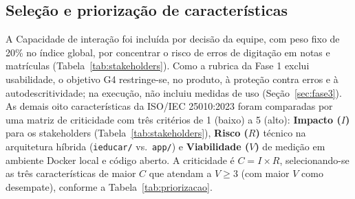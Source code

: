 \documentclass[conference]{model/IEEEtran}%
\begin{document}
\subsection{Seleção e priorização de características}
A Capacidade de interação foi incluída por decisão da equipe, com peso fixo de 20\% no índice global, por concentrar o risco de erros de digitação em notas e matrículas (Tabela~\ref{tab:stakeholders}). Como a rubrica da Fase 1 exclui usabilidade, o objetivo G4 restringe-se, no produto, à proteção contra erros e à autodescritividade; na execução, não incluiu medidas de uso (Seção~\ref{sec:fase3}). As demais oito características da ISO/IEC 25010:2023 foram comparadas por uma matriz de criticidade com três critérios de 1 (baixo) a 5 (alto): \textbf{Impacto ($I$)} para os stakeholders (Tabela~\ref{tab:stakeholders}), \textbf{Risco ($R$)} técnico na arquitetura híbrida (\texttt{ieducar/} vs.\ \texttt{app/}) e \textbf{Viabilidade ($V$)} de medição em ambiente Docker local e código aberto. A criticidade é $C = I \times R$, selecionando-se as três características de maior $C$ que atendam a $V \ge 3$ (com maior $V$ como desempate), conforme a Tabela~\ref{tab:priorizacao}.
\end{document}
